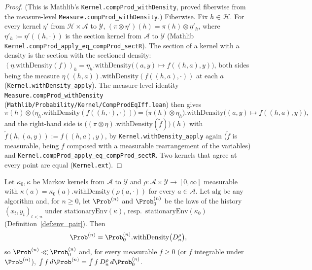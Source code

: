 \begin{proof}
\leanok
(This is Mathlib's \texttt{Kernel.compProd\_withDensity}, proved fiberwise from the
measure-level \texttt{Measure.compProd\_withDensity}.) Fiberwise. Fix $h\in\mathcal{H}$. For every kernel $\eta'$ from $\mathcal{H}\times\mathcal{A}$
to $\mathcal{Y}$, $(\pi\otimes\eta')(h) = \pi(h)\otimes\eta'_h$, where
$\eta'_h := \eta'((h,\cdot))$ is the section kernel from $\mathcal{A}$ to $\mathcal{Y}$
(Mathlib \texttt{Kernel.compProd\_apply\_eq\_compProd\_sectR}). The section of a kernel with
a density is the section with the sectioned density:
$(\eta.\mathrm{withDensity}(f))_h = \eta_h.\mathrm{withDensity}\big((a,y)\mapsto f((h,a),y)\big)$,
both sides being the measure $\eta((h,a)).\mathrm{withDensity}(f((h,a),\cdot))$ at each $a$
(\texttt{Kernel.withDensity\_apply}). The measure-level identity
\texttt{Measure.compProd\_withDensity} (\texttt{Mathlib/Probability/Kernel/CompProdEqIff.lean})
then gives
\[
  \pi(h)\otimes\big(\eta_h.\mathrm{withDensity}(f((h,\cdot),\cdot))\big)
  = \big(\pi(h)\otimes\eta_h\big).\mathrm{withDensity}\big((a,y)\mapsto f((h,a),y)\big),
\]
and the right-hand side is $\big((\pi\otimes\eta).\mathrm{withDensity}(\tilde f)\big)(h)$
with $\tilde f(h,(a,y)) := f((h,a),y)$, by \texttt{Kernel.withDensity\_apply} again
($\tilde f$ is measurable, being $f$ composed with a measurable rearrangement of the
variables) and \texttt{Kernel.compProd\_apply\_eq\_compProd\_sectR}. Two kernels that agree
at every point are equal (\texttt{Kernel.ext}).
\end{proof}

\begin{lemma}\label{lem:env_likelihood_ratio}
\leanok
{}
Let $\kappa_0,\kappa$ be Markov kernels from $\mathcal{A}$ to $\mathcal{Y}$ and
$\rho : \mathcal{A}\times\mathcal{Y}\to[0,\infty]$ measurable with
$\kappa(a) = \kappa_0(a).\mathrm{withDensity}(\rho(a,\cdot))$ for every $a\in\mathcal{A}$. Let
$\mathrm{alg}$ be any algorithm and, for $n\ge0$, let $\Prob^{(n)}$ and $\Prob_0^{(n)}$ be the
laws of the history $(x_t,y_t)_{t< n}$ under $\mathrm{stationaryEnv}(\kappa)$, resp.\
$\mathrm{stationaryEnv}(\kappa_0)$ (Definition~\ref{def:env_pair}). Then
\[
  \Prob^{(n)} = \Prob_0^{(n)}.\mathrm{withDensity}\big(D_n^\rho\big),
\]
so $\Prob^{(n)}\ll\Prob_0^{(n)}$ and, for every measurable $f\ge0$ (or $f$ integrable under
$\Prob^{(n)}$), $\int f\,d\Prob^{(n)} = \int f\,D_n^\rho\,d\Prob_0^{(n)}$.
\end{lemma}

